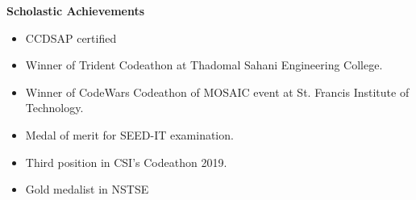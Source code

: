 \colorbox{titleColor}{\parbox{6.7in}{\textbf{Scholastic Achievements}}}
\vspace{-1pt}
\begin{itemize}
    \setlength{\itemsep}{0.1pt}
    \item CCDSAP certified
    \item Winner of Trident Codeathon at Thadomal Sahani Engineering College.
    \item Winner of CodeWars Codeathon of MOSAIC event at St. Francis Institute of Technology.
    \item Medal of merit for SEED-IT examination.
    \item Third position in CSI's Codeathon 2019.
    \item Gold medalist in NSTSE
\end{itemize}